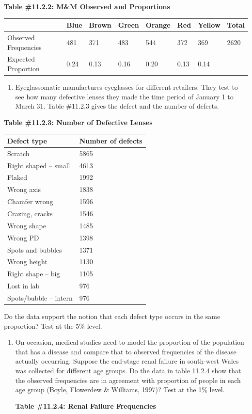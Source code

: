 \documentclass[
]{book}
\providecommand{\tightlist}{%
  \setlength{\itemsep}{0pt}\setlength{\parskip}{0pt}}
\begin{document}
\textbf{Table \#11.2.2: M\&M Observed and Proportions}

\begin{longtable}[]{@{}llllllll@{}}
\toprule
& Blue & Brown & Green & Orange & Red & Yellow & Total\tabularnewline
\midrule
\endhead
Observed Frequencies & 481 & 371 & 483 & 544 & 372 & 369 & 2620\tabularnewline
Expected Proportion & 0.24 & 0.13 & 0.16 & 0.20 & 0.13 & 0.14 &\tabularnewline
\bottomrule
\end{longtable}

\begin{enumerate}
\def\labelenumi{\arabic{enumi}.}
\setcounter{enumi}{1}
\tightlist
\item
  Eyeglassomatic manufactures eyeglasses for different retailers. They test to see how many defective lenses they made the time period of January 1 to March 31. Table \#11.2.3 gives the defect and the number of defects.
\end{enumerate}

\textbf{Table \#11.2.3: Number of Defective Lenses}

\begin{longtable}[]{@{}ll@{}}
\toprule
Defect type & Number of defects\tabularnewline
\midrule
\endhead
Scratch & 5865\tabularnewline
Right shaped -- small & 4613\tabularnewline
Flaked & 1992\tabularnewline
Wrong axis & 1838\tabularnewline
Chamfer wrong & 1596\tabularnewline
Crazing, cracks & 1546\tabularnewline
Wrong shape & 1485\tabularnewline
Wrong PD & 1398\tabularnewline
Spots and bubbles & 1371\tabularnewline
Wrong height & 1130\tabularnewline
Right shape -- big & 1105\tabularnewline
Lost in lab & 976\tabularnewline
Spots/bubble -- intern & 976\tabularnewline
\bottomrule
\end{longtable}

Do the data support the notion that each defect type occurs in the same proportion? Test at the 5\% level.

\begin{enumerate}
\def\labelenumi{\arabic{enumi}.}
\setcounter{enumi}{2}
\item
  On occasion, medical studies need to model the proportion of the population that has a disease and compare that to observed frequencies of the disease actually occurring. Suppose the end-stage renal failure in south-west Wales was collected for different age groups. Do the data in table 11.2.4 show that the observed frequencies are in agreement with proportion of people in each age group (Boyle, Flowerdew \& Williams, 1997)? Test at the 1\% level.

  \textbf{Table \#11.2.4: Renal Failure Frequencies}
\end{enumerate}
\end{document}
